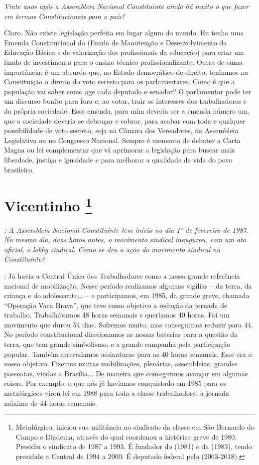 \medskip

\noindent\emph{Vinte anos após a Assembleia Nacional Constituinte ainda há
muito o que fazer em termos Constitucionais para o país?}

Claro. Não existe legislação perfeita em lugar algum do
mundo. Eu tenho uma Emenda Constitucional do  (Fundo de Manutenção
e Desenvolvimento da Educação Básica e de valorização dos profissionais
da educação) para criar um fundo de investimento para o ensino técnico
profissionalizante. Outra de suma importância: é um absurdo que, no
Estado democrático de direito, tenhamos na Constituição o direito do
voto secreto para os parlamentares. Como é que a população vai saber
como age cada deputado e senador? O parlamentar pode ter um discurso
bonito para fora e, ao votar, trair os interesses dos trabalhadores e da
própria sociedade. Essa emenda, para mim deveria ser a emenda número um,
que a sociedade deveria se debruçar e cobrar, para acabar com toda e
qualquer possibilidade de voto secreto, seja na Câmara dos Vereadores,
na Assembleia Legislativa ou no Congresso Nacional. Sempre é momento de
debater a Carta Magna ou lei complementar que vá aprimorar a legislação
para buscar mais liberdade, justiça e igualdade e para melhorar a
qualidade de vida do povo brasileiro.

\chapter{Vicentinho
\footnote{​Metalúrgico, iniciou sua militância no sindicato da classe em São
Bernardo do Campo e Diadema, através do qual coordenou a histórica greve
de 1980. Presidiu o sindicato de 1987 a 1993. É fundador do  (1981) e
da  (1983), tendo presidido a Central de 1994 a 2000. É deputado
federal pelo  (2003-2018).}}

\emph{: A Assembleia Nacional Constituinte tem início no dia 1° de
fevereiro de 1987. No mesmo dia, duas horas antes, o movimento sindical
inaugurou, com um ato oficial, o lobby sindical. Como se deu a ação do
movimento sindical na Constituinte?}

: Já havia a Central Única dos Trabalhadores como a
nossa grande referência nacional de mobilização. Nesse período
realizamos algumas vigílias -- da terra, da criança e do adolescente...
-- e participamos, em 1985, da grande greve, chamada ``Operação Vaca
Brava'', que teve como objetivo a redução da jornada de trabalho.
Trabalhávamos 48 horas semanais e queríamos 40 horas. Foi um movimento
que durou 54 dias. Sofremos muito, mas conseguimos reduzir para 44. No
período constitucional direcionamos as nossas baterias para a questão da
terra, que tem grande simbolismo, e a grande campanha pela participação
popular. Também arrecadamos assinaturas para as 40 horas semanais. Esse
era o nosso objetivo. Fizemos muitas mobilizações, plenárias,
assembleias, grandes passeatas, vindas a Brasília... De maneira que
conseguimos avançar em algumas coisas. Por exemplo: o que nós já
havíamos conquistado em 1985 para os metalúrgicos virou lei em 1988 para
toda a classe trabalhadora: a jornada máxima de 44 horas semanais.

